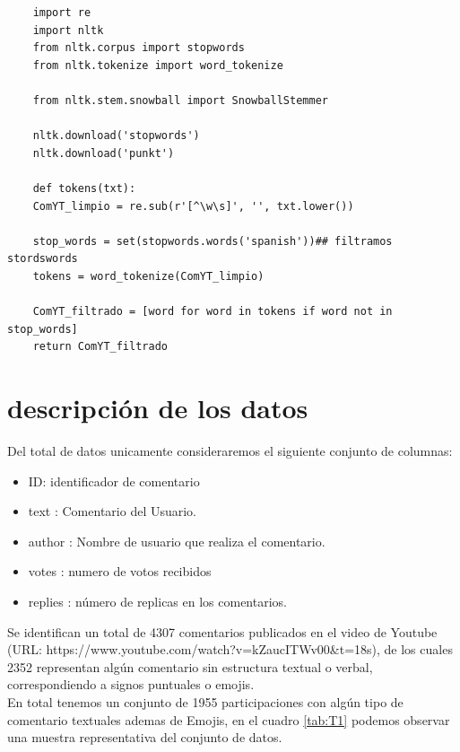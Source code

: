 \begin{lstlisting}
	import re
	import nltk
	from nltk.corpus import stopwords
	from nltk.tokenize import word_tokenize
	
	from nltk.stem.snowball import SnowballStemmer
	
	nltk.download('stopwords')
	nltk.download('punkt')
	
	def tokens(txt):
	ComYT_limpio = re.sub(r'[^\w\s]', '', txt.lower())
	
	stop_words = set(stopwords.words('spanish'))## filtramos stordswords 
	tokens = word_tokenize(ComYT_limpio)
	
	ComYT_filtrado = [word for word in tokens if word not in stop_words]
	return ComYT_filtrado
\end{lstlisting}


\chapter{descripción de los datos}

Del total de datos unicamente consideraremos el siguiente conjunto de columnas:\\

\begin{itemize}
	\item ID: identificador de comentario
	\item text : Comentario del Usuario.
	\item author : Nombre de usuario que realiza el comentario.
	\item votes : numero de votos recibidos 
	\item replies : número de replicas en los comentarios.\\
\end{itemize} 

Se identifican un total de 4307 comentarios publicados en el video de Youtube (URL: https://www.youtube.com/watch?v=kZaucITWv00&t=18s), de los cuales 2352 representan algún comentario sin estructura textual o verbal, correspondiendo a signos puntuales o emojis.\\

En total tenemos un conjunto de 1955 participaciones con algún tipo de comentario textuales ademas de Emojis, en el cuadro \ref{tab:T1} podemos observar una muestra representativa del conjunto de datos. \\

